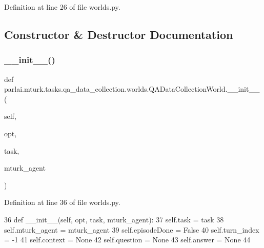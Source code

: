 Definition at line 26 of file worlds.\+py.



\subsection{Constructor \& Destructor Documentation}
\mbox{\label{classparlai_1_1mturk_1_1tasks_1_1qa__data__collection_1_1worlds_1_1QADataCollectionWorld_a84d083e476e3f8961ce40b09d187def2}} 
\subsubsection{\texorpdfstring{\+\_\+\+\_\+init\+\_\+\+\_\+()}{\_\_init\_\_()}}
{\footnotesize\ttfamily def parlai.\+mturk.\+tasks.\+qa\+\_\+data\+\_\+collection.\+worlds.\+Q\+A\+Data\+Collection\+World.\+\_\+\+\_\+init\+\_\+\+\_\+ (\begin{DoxyParamCaption}\item[{}]{self,  }\item[{}]{opt,  }\item[{}]{task,  }\item[{}]{mturk\+\_\+agent }\end{DoxyParamCaption})}



Definition at line 36 of file worlds.\+py.


\begin{DoxyCode}
36     \textcolor{keyword}{def }\_\_init\_\_(self, opt, task, mturk\_agent):
37         self.task = task
38         self.mturk\_agent = mturk\_agent
39         self.episodeDone = \textcolor{keyword}{False}
40         self.turn\_index = -1
41         self.context = \textcolor{keywordtype}{None}
42         self.question = \textcolor{keywordtype}{None}
43         self.answer = \textcolor{keywordtype}{None}
44 
\end{DoxyCode}


